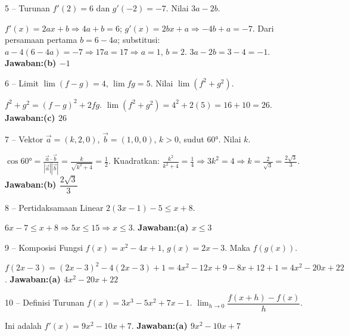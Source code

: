 \documentclass[11pt]{article}
\newcommand{\jawaban}[1]{\textbf{Jawaban:}\enspace\colorbox{gold!30}{\textbf{#1}}}
\begin{document}
\begin{soal}{5 -- Turunan}
$f'(2)=6$ dan $g'(-2)=-7$. Nilai $3a-2b$.
\end{soal}
\begin{pembox}
$f'(x)=2ax+b\Rightarrow 4a+b=6$; $g'(x)=2bx+a\Rightarrow -4b+a=-7$.
Dari persamaan pertama $b=6-4a$; substitusi: $a-4(6-4a)=-7\Rightarrow17a=17\Rightarrow a=1$, $b=2$.
$3a-2b=3-4=-1$.
\jawaban{(b) $-1$}
\end{pembox}

\begin{soal}{6 -- Limit}
$\lim(f-g)=4$, $\lim fg=5$. Nilai $\lim(f^2+g^2)$.
\end{soal}
\begin{pembox}
$f^2+g^2=(f-g)^2+2fg$. $\lim(f^2+g^2)=4^2+2(5)=16+10=26$.
\jawaban{(c) $26$}
\end{pembox}

\begin{soal}{7 -- Vektor}
$\vec a=(k,2,0)$, $\vec b=(1,0,0)$, $k>0$, sudut $60°$. Nilai $k$.
\end{soal}
\begin{pembox}
$\cos60°=\frac{\vec a\cdot\vec b}{|\vec a||\vec b|}=\frac{k}{\sqrt{k^2+4}}=\frac12$. Kuadratkan: $\frac{k^2}{k^2+4}=\frac14\Rightarrow3k^2=4\Rightarrow k=\frac{2}{\sqrt3}=\frac{2\sqrt3}{3}$.
\jawaban{(b) $\dfrac{2\sqrt{3}}{3}$}
\end{pembox}

\begin{soal}{8 -- Pertidaksamaan Linear}
$2(3x-1)-5\leq x+8$.
\end{soal}
\begin{pembox}
$6x-7\leq x+8\Rightarrow5x\leq15\Rightarrow x\leq3$.
\jawaban{(a) $x\leq3$}
\end{pembox}

\begin{soal}{9 -- Komposisi Fungsi}
$f(x)=x^2-4x+1$, $g(x)=2x-3$. Maka $f(g(x))$.
\end{soal}
\begin{pembox}
$f(2x-3)=(2x-3)^2-4(2x-3)+1=4x^2-12x+9-8x+12+1=4x^2-20x+22$.
\jawaban{(a) $4x^2-20x+22$}
\end{pembox}

\begin{soal}{10 -- Definisi Turunan}
$f(x)=3x^3-5x^2+7x-1$. $\displaystyle\lim_{h\to0}\dfrac{f(x+h)-f(x)}{h}$.
\end{soal}
\begin{pembox}
Ini adalah $f'(x)=9x^2-10x+7$.
\jawaban{(a) $9x^2-10x+7$}
\end{pembox}
\end{document}
